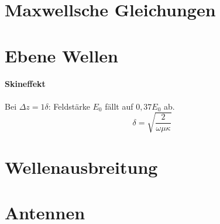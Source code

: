 \documentclass[DIV=calc, fontsize=7pt, paper=a4, twocolumn]{scrartcl}
\begin{document}
\section*{Maxwellsche Gleichungen}

\section*{Ebene Wellen}
\paragraph{Skineffekt} Bei $\Delta z = 1\delta$: Feldstärke $E_0$ fällt auf $0,37 E_0$ ab.
\begin{equation*}
\delta = \sqrt{\frac{2}{\omega \mu \kappa}}
\end{equation*}

\section*{Wellenausbreitung}

\section*{Antennen}
\end{document}
